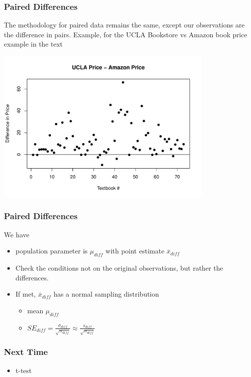 \documentclass[handout]{beamer}
\newcommand{\blue}[1]{\textcolor{blue2}{#1}}
\newcommand{\xbar}{\overline{x}}
\begin{document}
\begin{frame}[fragile]
\frametitle{Paired Differences}
The methodology for paired data remains the same, except our \blue{observations} are the difference in pairs.  Example, for the UCLA Bookstore vs Amazon book price example in the text
\begin{center}
\includegraphics[width=0.8\textwidth]{figure/diff2.pdf}
\end{center}


\end{frame}


\begin{frame}[fragile]
\frametitle{Paired Differences}
We have
\begin{itemize}
\pause \item population parameter is $\mu_{diff}$ with point estimate $\xbar_{diff}$
\pause \item Check the conditions not on the original observations, but rather the \blue{differences}.
\pause \item If met, $\xbar_{diff}$ has a normal sampling distribution
\begin{itemize}
\item mean $\mu_{diff}$
\item $SE_{diff} = \frac{\sigma_{diff}}{\sqrt{n_{diff}}} \approx \frac{s_{diff}}{\sqrt{n_{diff}}}$
\end{itemize} 
\end{itemize}


\end{frame}


\begin{frame}[fragile]
\frametitle{Next Time}

\begin{itemize}
\item t-test
\end{itemize}


\end{frame}
\end{document}

